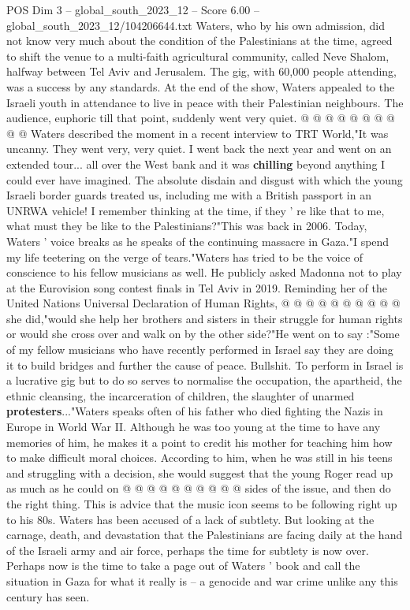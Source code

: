 \begin{textsample}{POS Dim 3 – global\_south\_2023\_12 – Score 6.00 – global\_south\_2023\_12/104206644.txt}
Waters, who by his own admission, did not know very much about the condition of the Palestinians at the time, agreed to shift the venue to a multi-faith agricultural community, called Neve Shalom, halfway between Tel Aviv and Jerusalem.
The gig, with 60,000 people attending, was a success by any standards.
At the end of the show, Waters appealed to the Israeli youth in attendance to live in peace with their Palestinian neighbours.
The audience, euphoric till that point, suddenly went very quiet. @ @ @ @ @ @ @ @ @ @ Waters described the moment in a recent interview to TRT World,"It was uncanny.
They went very, very quiet.
I went back the next year and went on an extended tour... all over the West bank and it was \textbf{chilling} beyond anything I could ever have imagined.
The absolute disdain and disgust with which the young Israeli border guards treated us, including me with a British passport in an UNRWA vehicle!
I remember thinking at the time, if they ' re like that to me, what must they be like to the Palestinians?"This was back in 2006.
Today, Waters ' voice breaks as he speaks of the continuing massacre in Gaza."I spend my life teetering on the verge of tears."Waters has tried to be the voice of conscience to his fellow musicians as well.
He publicly asked Madonna not to play at the Eurovision song contest finals in Tel Aviv in 2019.
Reminding her of the United Nations Universal Declaration of Human Rights, @ @ @ @ @ @ @ @ @ @ she did,"would she help her brothers and sisters in their struggle for human rights or would she cross over and walk on by the other side?"He went on to say :"Some of my fellow musicians who have recently performed in Israel say they are doing it to build bridges and further the cause of peace.
Bullshit.
To perform in Israel is a lucrative gig but to do so serves to normalise the occupation, the apartheid, the ethnic cleansing, the incarceration of children, the slaughter of unarmed \textbf{protesters}..."Waters speaks often of his father who died fighting the Nazis in Europe in World War II.
Although he was too young at the time to have any memories of him, he makes it a point to credit his mother for teaching him how to make difficult moral choices.
According to him, when he was still in his teens and struggling with a decision, she would suggest that the young Roger read up as much as he could on @ @ @ @ @ @ @ @ @ @ sides of the issue, and then do the right thing.
This is advice that the music icon seems to be following right up to his 80s.
Waters has been accused of a lack of subtlety.
But looking at the carnage, death, and devastation that the Palestinians are facing daily at the hand of the Israeli army and air force, perhaps the time for subtlety is now over.
Perhaps now is the time to take a page out of Waters ' book and call the situation in Gaza for what it really is -- a genocide and war crime unlike any this century has seen.

\end{textsample}
